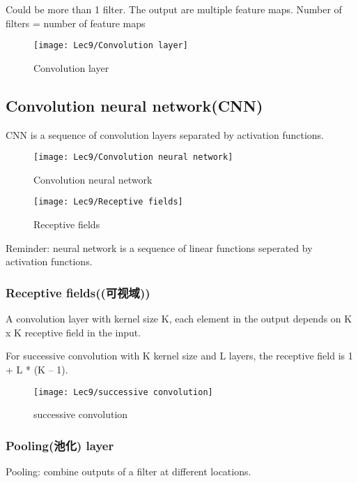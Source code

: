 Could be more than 1 filter. The output are multiple feature maps. Number of filters = number of feature maps

\begin{figure}[H]
    \centering
    \texttt{[image: Lec9/Convolution layer]}
    \caption{Convolution layer}
\end{figure}

\subsection{Convolution neural network(CNN)}
CNN is a sequence of convolution layers separated by activation functions. 

\begin{figure}[H]
    \centering
    \texttt{[image: Lec9/Convolution neural network]}
    \caption{Convolution neural network}
\end{figure}

\begin{wrapfigure}{r}{0.38\textwidth}
    \centering
    \texttt{[image: Lec9/Receptive fields]}
    \caption{Receptive fields}
\end{wrapfigure}

Reminder: neural network is a sequence of linear functions seperated by activation functions. 

\subsubsection{Receptive fields((可视域))}


A convolution layer with kernel size K, each element in the output depends on K x K receptive field in the input. 

For successive convolution with K kernel size and L layers, the receptive field is 1 + L * (K – 1). 

\begin{figure}[H]
    \centering
    \texttt{[image: Lec9/successive convolution]}
    \caption{successive convolution}
\end{figure}

\subsubsection{Pooling(池化) layer}

Pooling: combine outputs of a filter at different locations. 

